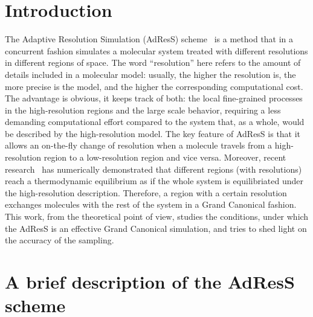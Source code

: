 \documentclass[aip,jcp,a4paper,reprint,onecolumn]{revtex4-1}
\begin{document}
\section{Introduction}
The Adaptive Resolution Simulation (AdResS) scheme~\cite{jcp,pre} is a
method that in a concurrent fashion simulates a molecular system treated with different
resolutions in different regions of space.  The word ``resolution''
here refers to the amount of details included in a molecular model: usually, the higher the
resolution is, the more precise is the model, and the higher the corresponding computational cost.  The advantage is obvious, it
keeps track of both: the local fine-grained processes in the
high-resolution regions and the large scale behavior, requiring a less demanding computational effort compared to the system that, as a
whole, would be described by the high-resolution model. The key feature of
AdResS is that it allows an on-the-fly change of resolution when a
molecule travels from a high-resolution region to a low-resolution
region and vice versa. Moreover, recent research~\cite{prlgc, rdfcorr}
has numerically demonstrated that different regions (with resolutions) reach a
thermodynamic equilibrium as if the whole system is equilibriated
under the high-resolution description. Therefore, a region with a
certain resolution exchanges molecules with the rest of the system in
a Grand Canonical fashion. This work, from the theoretical point of
view, studies the conditions, under which the AdResS is an effective
Grand Canonical simulation, and tries to shed light on the accuracy of
the sampling.

\section{A brief description of the AdResS scheme}
\end{document}
